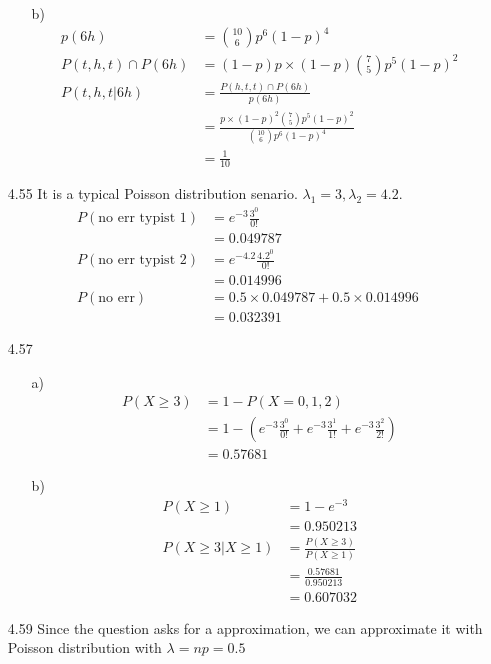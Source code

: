 \documentclass{article}
\begin{document}
\begin{itemize}
\begin{itemize}
        \item [b)]\begin{align*}
            p(6h) &= \binom{10}{6} p^6(1-p)^4\\
            P(t,h,t)\cap P(6h)&=(1-p)p\times (1-p)\binom{7}{5} p^5(1-p)^2\\
            P(t,h,t|6h) &= \frac{P(h,t,t)\cap P(6h)}{p(6h)}\\
            &=\frac{p\times (1-p)^2\binom{7}{5} p^5(1-p)^2}{\binom{10}{6} p^6(1-p)^4}\\
            &=\frac{1}{10}
        \end{align*}
    \end{itemize}
    \item [4.55] It is a typical Poisson distribution senario. \(\lambda_1 = 3, \lambda_2 = 4.2\).\begin{align*}
        P(\text{no err typist 1}) &= e^{-3}\frac{3^0}{0!}\\
        &=0.049787\\
        P(\text{no err typist 2}) &= e^{-4.2}\frac{4.2^0}{0!}\\
        &=0.014996\\
        P(\text{no err}) &= 0.5 \times 0.049787+0.5\times 0.014996\\
        &=0.032391
    \end{align*}
    \item [4.57]\begin{itemize}
        \item [a)] \begin{align*}
            P(X\geqslant3) &= 1-P(X=0,1,2)\\
            &=1-\left(e^{-3}\frac{3^0}{0!}+e^{-3}\frac{3^1}{1!}+e^{-3}\frac{3^2}{2!}\right)\\
            &=0.57681
        \end{align*}
        \item [b)]\begin{align*}
            P(X\geqslant 1) &=1-e^{-3}\\ &= 0.950213\\  
            P(X\geqslant3|X\geqslant1) &= \frac{P(X\geqslant3)}{P(X\geqslant 1)}\\
            &=\frac{0.57681}{0.950213}\\
            &=0.607032
        \end{align*}
    \end{itemize}
    \item [4.59] Since the question asks for a approximation, we can approximate it with Poisson distribution with \(\lambda = np = 0.5\)

\end{itemize}
\end{document}
